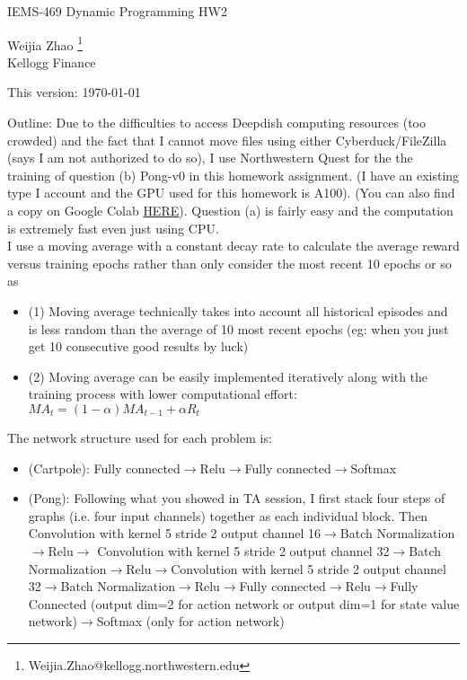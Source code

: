 \documentclass[12pt,letterpaper]{article}
\begin{document}
\begin{center}
\large IEMS-469 Dynamic Programming  HW2

\bigskip
Weijia Zhao \footnote{Weijia.Zhao@kellogg.northwestern.edu}\\
Kellogg Finance

\bigskip
This version: \today
\end{center}

\newpage
Outline: Due to the difficulties to access Deepdish computing resources (too crowded) and the fact that I cannot move files using either Cyberduck/FileZilla (says I am not authorized to do so), I use Northwestern Quest for the the training of question (b) Pong-v0 in this homework assignment. (I have an existing type I account and the GPU used for this homework is A100). (You can also find a copy on Google Colab \href{https://colab.research.google.com/drive/1P2JLPoPdEyRfwSj1ebTzGk2u2wVtkD0G?usp=sharing}{HERE}). Question (a) is fairly easy and the computation is extremely fast even just using CPU.\\

I use a moving average with a constant decay rate to calculate the average reward versus training epochs rather than only consider the most recent 10 epochs or so as
\begin{itemize}
\item (1) Moving average technically takes into account all historical episodes and is less random than the average of 10 most recent epochs (eg: when you just get 10 consecutive good results by luck)
\item (2) Moving average can be easily implemented iteratively along with the training process with lower computational effort: $MA_t=(1-\alpha)MA_{t-1}+\alpha R_t$
\end{itemize}

The network structure used for each problem is:
\begin{itemize}
\item (Cartpole): Fully connected$\rightarrow$Relu$\rightarrow$Fully connected$\rightarrow$Softmax
\item (Pong): Following what you showed in TA session, I first stack four steps of graphs (i.e. four input channels) together as each individual block. Then Convolution with kernel 5 stride 2 output channel 16$\rightarrow$Batch Normalization$\rightarrow$Relu$\rightarrow$ Convolution with kernel 5 stride 2 output channel 32$\rightarrow$Batch Normalization$\rightarrow$Relu$\rightarrow$Convolution with kernel 5 stride 2 output channel 32$\rightarrow$Batch Normalization$\rightarrow$Relu$\rightarrow$Fully connected$\rightarrow$Relu$\rightarrow$Fully Connected (output dim=2 for action network or output dim=1 for state value network)$\rightarrow$Softmax (only for action network)
\end{itemize}
\end{document}
